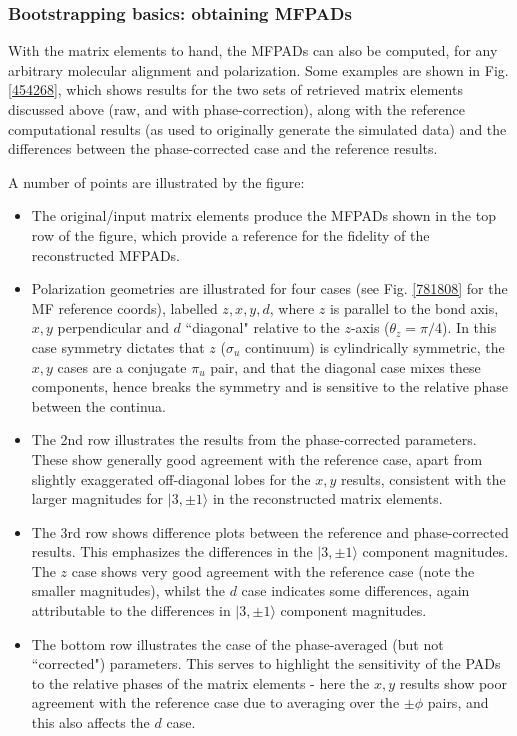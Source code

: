 \documentclass[10pt]{article}
\begin{document}

\subsubsection{Bootstrapping basics: obtaining MFPADs\label{sec:bootstrap-MFPADs}}

With the matrix elements to hand, the MFPADs can also be computed, for any arbitrary molecular alignment and polarization. Some examples are shown in Fig. \ref{454268}, which shows results for the two sets of retrieved matrix elements discussed above (raw, and with phase-correction), along with the reference computational results (as used to originally generate the simulated data) and the differences between the phase-corrected case and the reference results.

A number of points are illustrated by the figure:

\begin{itemize}
\item The original/input matrix elements produce the MFPADs shown in the top row of the figure, which provide a reference for the fidelity of the reconstructed MFPADs. 
\item Polarization geometries are illustrated for four cases (see Fig. \ref{781808} for the MF reference coords), labelled $z,x,y,d$, where $z$ is parallel to the bond axis, $x,y$ perpendicular and $d$ ``diagonal" relative to the $z$-axis ($\theta_{z}=\pi/4$). In this case symmetry dictates that $z$ ($\sigma_u$ continuum) is cylindrically symmetric, the $x,y$ cases are a conjugate $\pi_u$ pair, and that the diagonal case mixes these components, hence breaks the symmetry and is sensitive to the relative phase between the continua.
\item The 2nd row illustrates the results from the phase-corrected parameters. These show generally good agreement with the reference case, apart from slightly exaggerated off-diagonal lobes for the $x,y$ results, consistent with the larger magnitudes for $|3,\pm1\rangle$ in the reconstructed matrix elements.
\item The 3rd row shows difference plots between the reference and phase-corrected results. This emphasizes the differences in the $|3,\pm1\rangle$ component magnitudes. The $z$ case shows very good agreement with the reference case (note the smaller magnitudes), whilst the $d$ case indicates some differences, again attributable to the differences in $|3,\pm1\rangle$ component magnitudes.
\item The bottom row illustrates the case of the phase-averaged (but not ``corrected") parameters. This serves to highlight the sensitivity of the PADs to the relative phases of the matrix elements - here the $x,y$ results show poor agreement with the reference case due to averaging over the $\pm\phi$ pairs, and this also affects the $d$ case.
\end{itemize}
\end{document}
